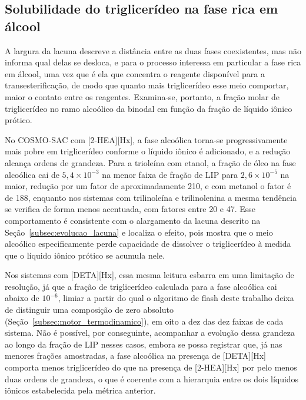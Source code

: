 \subsection{Solubilidade do triglicerídeo na fase rica em álcool}
\label{subsec:solubilidade_fase_alcoolica}

A largura da lacuna descreve a distância entre as duas fases coexistentes, mas não informa qual delas se desloca, e para o processo interessa em particular a fase rica em álcool, uma vez que é ela que concentra o reagente disponível para a transesterificação, de modo que quanto mais triglicerídeo esse meio comportar, maior o contato entre os reagentes. Examina-se, portanto, a fração molar de triglicerídeo no ramo alcoólico da binodal em função da fração de líquido iônico prótico.

No COSMO-SAC com [2-HEA][Hx], a fase alcoólica torna-se progressivamente mais pobre em triglicerídeo conforme o líquido iônico é adicionado, e a redução alcança ordens de grandeza. Para a trioleína com etanol, a fração de óleo na fase alcoólica cai de $5{,}4 \times 10^{-3}$ na menor faixa de fração de LIP para $2{,}6 \times 10^{-5}$ na maior, redução por um fator de aproximadamente 210, e com metanol o fator é de 188, enquanto nos sistemas com trilinoleína e trilinolenina a mesma tendência se verifica de forma menos acentuada, com fatores entre 20 e 47. Esse comportamento é consistente com o alargamento da lacuna descrito na Seção~\ref{subsec:evolucao_lacuna} e localiza o efeito, pois mostra que o meio alcoólico especificamente perde capacidade de dissolver o triglicerídeo à medida que o líquido iônico prótico se acumula nele.

Nos sistemas com [DETA][Hx], essa mesma leitura esbarra em uma limitação de resolução, já que a fração de triglicerídeo calculada para a fase alcoólica cai abaixo de $10^{-6}$, limiar a partir do qual o algoritmo de flash deste trabalho deixa de distinguir uma composição de zero absoluto (Seção~\ref{subsec:motor_termodinamico}), em oito a dez das dez faixas de cada sistema. Não é possível, por conseguinte, acompanhar a evolução dessa grandeza ao longo da fração de LIP nesses casos, embora se possa registrar que, já nas menores frações amostradas, a fase alcoólica na presença de [DETA][Hx] comporta menos triglicerídeo do que na presença de [2-HEA][Hx] por pelo menos duas ordens de grandeza, o que é coerente com a hierarquia entre os dois líquidos iônicos estabelecida pela métrica anterior.

